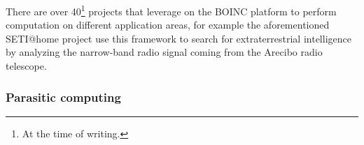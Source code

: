 There are over 40\footnote{At the time of writing.} projects that leverage on
the \ac{BOINC} platform to perform computation on different application areas,
for example the aforementioned \ac{SETI@home} project use this framework to
search for extraterrestrial intelligence by analyzing the narrow-band radio
signal coming from the Arecibo radio telescope.


\subsubsection{Parasitic computing}
\label{sec:bg:crowd:auto:parasitic}
